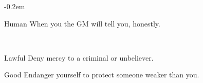 \documentclass[8pt]{extarticle}
\begin{document}
\openup -0.2em

\charbanner

\begin{minipage}[t]{3.2in}

\begin{optfeature}{Human}
  When you  the GM will tell you, honestly.
\end{optfeature}

\ 


\begin{optfeature}{Lawful}
  Deny mercy to a criminal or unbeliever.
\end{optfeature}

\begin{optfeature}{Good}
  Endanger yourself to protect someone weaker than you.
\end{optfeature}

\ 


\vfill\null
\end{minipage}
\end{document}
